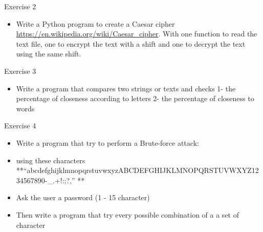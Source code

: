 \documentclass[
  8pt,
  ignorenonframetext,
]{beamer}
\providecommand{\tightlist}{%
  \setlength{\itemsep}{0pt}\setlength{\parskip}{0pt}}
\begin{document}
\begin{frame}{Exercise 2}
\protect\hypertarget{exercise-2}{}
\begin{itemize}
\tightlist
\item
  Write a Python program to create a Caesar cipher
  \url{https://en.wikipedia.org/wiki/Caesar_cipher}. With one function
  to read the text file, one to encrypt the text with a shift and one to
  decrypt the text using the same shift.
\end{itemize}
\end{frame}

\begin{frame}{Exercise 3}
\protect\hypertarget{exercise-3}{}
\begin{itemize}
\tightlist
\item
  Write a program that compares two strings or texts and checks 1- the
  percentage of closeness according to letters 2- the percentage of
  closeness to words
\end{itemize}
\end{frame}

\begin{frame}{Exercise 4}
\protect\hypertarget{exercise-4}{}
\begin{itemize}
\tightlist
\item
  Write a program that try to perform a Brute-force attack:
\item
  using these characters
  **``abcdefghijklmnopqrstuvwxyzABCDEFGHIJKLMNOPQRSTUVWXYZ1234567890-\_.+!:;?,''
  **
\item
  Ask the user a password (1 - 15 character)
\item
  Then write a program that try every possible combination of a a set of
  character
\end{itemize}
\end{frame}
\end{document}
